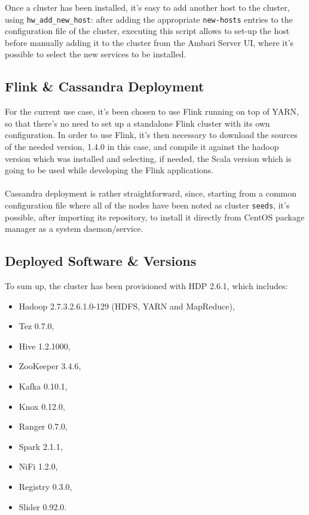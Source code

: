 Once a cluster has been installed, it's easy to add another host to the cluster, using \texttt{hw\_add\_new\_host}: after adding the appropriate \texttt{new-hosts} entries to the configuration file of the cluster, executing this script allows to set-up the host before manually adding it to the cluster from the Ambari Server UI, where it's possible to select the new services to be installed.

\subsection{Flink \& Cassandra Deployment}

For the current use case, it's been chosen to use Flink running on top of YARN, so that there's no need to set up a standalone Flink cluster with its own configuration. In order to use Flink, it's then necessary to download the sources of the needed version, 1.4.0 in this case, and compile it against the hadoop version which was installed and selecting, if needed, the Scala version which is going to be used while developing the Flink applications.\\
\\
Cassandra deployment is rather straightforward, since, starting from a common \texttt{} configuration file where all of the nodes have been noted as cluster \texttt{seeds}, it's possible, after importing its repository, to install it directly from CentOS package manager as a system daemon/service.

\subsection{Deployed Software \& Versions}

To sum up, the cluster has been provisioned with HDP 2.6.1, which includes:
\begin{itemize}
    \item Hadoop 2.7.3.2.6.1.0-129 (HDFS, YARN and MapReduce),
    \item Tez 0.7.0,
    \item Hive 1.2.1000, 
    \item ZooKeeper 3.4.6,
    \item Kafka 0.10.1,
    \item Knox 0.12.0,
    \item Ranger 0.7.0,
    \item Spark 2.1.1,
    \item NiFi 1.2.0,
    \item Registry 0.3.0,
    \item Slider 0.92.0.
\end{itemize}

